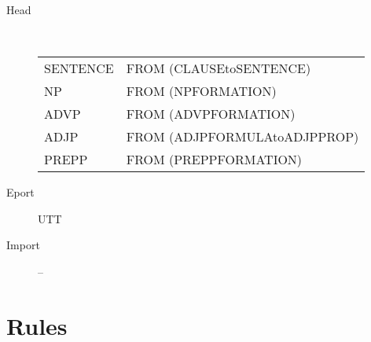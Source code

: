\begin{description}
  \item[Head] \mbox{}\\
    \begin{tabular}{ll}
SENTENCE & FROM (CLAUSEtoSENTENCE)\\
NP       & FROM (NPFORMATION)\\
ADVP     & FROM (ADVPFORMATION)\\
ADJP     & FROM (ADJPFORMULAtoADJPPROP)\\
PREPP    & FROM (PREPPFORMATION)\\
    \end{tabular}
  \item[Eport] UTT
  \item[Import] --
\end{description}

\newpage
\section{Rules}

